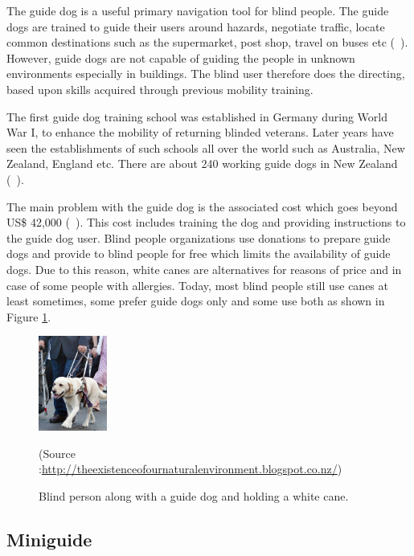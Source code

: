 The guide dog is a useful primary 
navigation tool for blind people. 
The guide dogs are trained to 
guide their users around hazards, negotiate traffic, 
locate common destinations 
such as the supermarket, post shop, travel on buses etc
(~\citet{dog1}).  
However, guide dogs are not capable of 
guiding the people in unknown environments 
especially in buildings. 
The blind user therefore does the directing, 
based upon skills acquired through 
previous mobility training. 


The first guide dog training school was established in 
Germany during World War I, to enhance the mobility of 
returning blinded veterans.
Later years have seen the establishments of such 
schools all over the world such as Australia, New Zealand, England etc.
There are about 240 working guide dogs in 
New Zealand (~\citet{dog2}).

The main problem with the guide dog is the 
associated cost which goes beyond 
US\$ 42,000 (~\citet{dog3}). 
This cost includes training the dog and 
providing instructions to the guide dog user. 
Blind people organizations use donations 
to prepare guide dogs and provide to blind people 
for free which limits the availability of guide dogs. 
Due to this reason, white canes are alternatives 
for reasons of price and in case of some people 
with allergies. Today, most blind people still use canes 
at least sometimes, some prefer guide dogs only 
and some use both as shown in Figure \ref{fig:dog}.   





\begin{figure}[h!]
\centering{} \includegraphics[width=0.2\textwidth]{Images/guidedog.jpg}
\caption{\label{fig:guidedog} Blind person along with a guide dog 
and holding a white cane.}
\label{fig:dog}
\small (Source :\url{http://theexistenceofournaturalenvironment.blogspot.co.nz/})
\end{figure}


\subsection{Miniguide}
\label{sec:miniguide}

